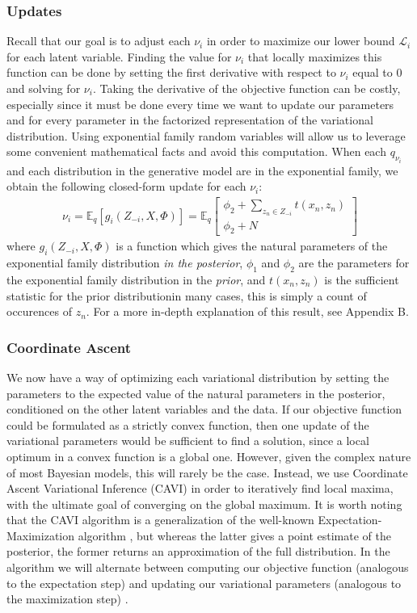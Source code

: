 \documentclass[12pt,letterpaper]{article}
\begin{document}
\subsubsection{Updates}
Recall that our goal is to adjust each $\nu_i$ in order to maximize our lower bound $\mathcal{L}_i$ for each latent variable. Finding the value for $\nu_i$ that locally maximizes this function can be done by setting the first derivative with respect to $\nu_i$ equal to 0 and solving for $\nu_i$. Taking the derivative of the objective function can be costly, especially since it must be done every time we want to update our parameters and for every parameter in the factorized representation of the variational distribution. Using exponential family random variables will allow us to leverage some convenient mathematical facts and avoid this computation. When each $q_{\nu_i}$ and each distribution in the generative model are in the exponential family, we obtain the following closed-form update for each $\nu_i$: 
\begin{align}
\nu_i = \mathbb{E}_q[g_i(Z_{-i}, X, \Phi)] = \mathbb{E}_q \begin{bmatrix} \phi_2 + \sum\limits_{z_n \in Z_{-i}} t(x_n, z_n) \\ \phi_2 + N \end{bmatrix}
\end{align}
where $g_i(Z_{-i}, X, \Phi)$ is a function which gives the natural parameters of the exponential family distribution \textit{in the posterior}, $\phi_1$ and $\phi_2$ are the parameters for the exponential family distribution in the \textit{prior}, and $t(x_n, z_n)$ is the sufficient statistic for the prior distribution\textemdash in many cases, this is simply a count of occurences of $z_n$. For a more in-depth explanation of this result, see Appendix B. 

\subsubsection{Coordinate Ascent}
We now have a way of optimizing each variational distribution by setting the parameters to the expected value of the natural parameters in the posterior, conditioned on the other latent variables and the data. If our objective function could be formulated as a strictly convex function, then one update of the variational parameters would be sufficient to find a solution, since a local optimum in a convex function is a global one. However, given the complex nature of most Bayesian models, this will rarely be the case. Instead, we use Coordinate Ascent Variational Inference (CAVI) in order to iteratively find local maxima, with the ultimate goal of converging on the global maximum. It is worth noting that the CAVI algorithm is a generalization of the well-known Expectation-Maximization algorithm \citep{dempster:1977} , but whereas the latter gives a point estimate of the posterior, the former returns an approximation of the full distribution. In the algorithm we will alternate between computing our objective function (analogous to the expectation step) and updating our variational parameters (analogous to the maximization step) \citep{neal:1998}.
\end{document}
